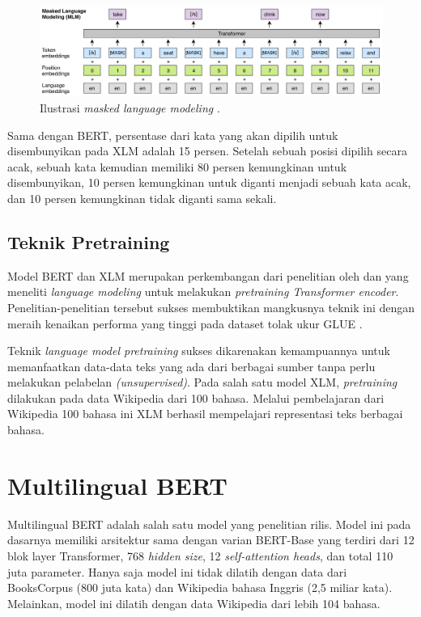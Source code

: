    \begin{figure}[ht]
        \centering
        \includegraphics[width=1\textwidth]{resources/ilustrasi-mlm.png}
        \caption{Ilustrasi \textit{masked language modeling} \parencite{LampleConneau2019}.}
        \label{fig:ilustrasi_mlm}
    \end{figure}

    Sama dengan BERT, persentase dari kata yang akan dipilih untuk disembunyikan pada XLM adalah 15 persen. Setelah sebuah posisi dipilih secara acak, sebuah kata kemudian memiliki 80 persen kemungkinan untuk disembunyikan, 10 persen kemungkinan untuk diganti menjadi sebuah kata acak, dan 10 persen kemungkinan tidak diganti sama sekali.

    \subsection{Teknik Pretraining}
    Model BERT dan XLM merupakan perkembangan dari penelitian oleh \parencite{radford2018improving} dan \parencite{HowardRuder2018} yang meneliti \textit{language modeling} untuk melakukan \textit{pretraining Transformer encoder}. Penelitian-penelitian tersebut sukses membuktikan mangkusnya teknik ini dengan meraih kenaikan performa yang tinggi pada dataset tolak ukur GLUE \parencite{GLUE2019}.

    Teknik \textit{language model pretraining} sukses dikarenakan kemampuannya untuk memanfaatkan data-data teks yang ada dari berbagai sumber tanpa perlu melakukan pelabelan \textit{(unsupervised)}. Pada salah satu model XLM, \textit{pretraining} dilakukan pada data Wikipedia dari 100 bahasa. Melalui pembelajaran dari Wikipedia 100 bahasa ini XLM berhasil mempelajari representasi teks berbagai bahasa.

\section{Multilingual BERT}
    Multilingual BERT adalah salah satu model yang penelitian \parencite{Devlin_Chang_Lee_Toutanova_2019} rilis. Model ini pada dasarnya memiliki arsitektur sama dengan varian BERT-Base yang terdiri dari 12 blok layer Transformer, 768 \textit{hidden size}, 12 \textit{self-attention heads}, dan total 110 juta parameter. Hanya saja model ini tidak dilatih dengan data dari BooksCorpus (800 juta kata) dan Wikipedia bahasa Inggris (2,5 miliar kata). Melainkan, model ini dilatih dengan data Wikipedia dari lebih 104 bahasa.
    
